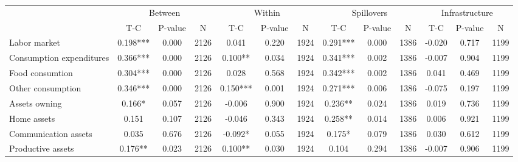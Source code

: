 
\begin{tabular}{l*{12}{c}}\hline&\multicolumn{3}{c}{Between}&\multicolumn{3}{c}{Within}&\multicolumn{3}{c}{Spillovers}&\multicolumn{3}{c}{Infrastructure} \\ \cmidrule(r){2-4}\cmidrule(l){5-7}\cmidrule(l){8-10}\cmidrule(l){9-13} & {T-C} & {P-value} & {N} & {T-C} & {P-value} & {N}  & {T-C} & {P-value} & {N} & {T-C} & {P-value} & {N} \\ \midrule

 Labor market &        0.198*** &        0.000 & 2126    &        0.041 &        0.220 & 1924    &        0.291*** &        0.000 & 1386 &       -0.020 &        0.717 & 1199 \\ 

 Consumption expenditures &        0.366*** &        0.000 & 2126    &        0.100** &        0.034 & 1924    &        0.341*** &        0.002 & 1386 &       -0.007 &        0.904 & 1199 \\ 

 Food consumtion &        0.304*** &        0.000 & 2126    &        0.028 &        0.568 & 1924    &        0.342*** &        0.002 & 1386 &        0.041 &        0.469 & 1199 \\ 

 Other consumption &        0.346*** &        0.000 & 2126    &        0.150*** &        0.001 & 1924    &        0.271*** &        0.006 & 1386 &       -0.075 &        0.197 & 1199 \\ 

 Assets owning &        0.166* &        0.057 & 2126    &       -0.006 &        0.900 & 1924    &        0.236** &        0.024 & 1386 &        0.019 &        0.736 & 1199 \\ 

 Home assets &        0.151 &        0.107 & 2126    &       -0.046 &        0.343 & 1924    &        0.258** &        0.014 & 1386 &        0.006 &        0.921 & 1199 \\ 

 Communication assets &        0.035 &        0.676 & 2126    &       -0.092* &        0.055 & 1924    &        0.175* &        0.079 & 1386 &        0.030 &        0.612 & 1199 \\ 

 Productive assets &        0.176** &        0.023 & 2126    &        0.100** &        0.030 & 1924    &        0.104 &        0.294 & 1386 &       -0.007 &        0.906 & 1199 \\ 


\end{tabular}
